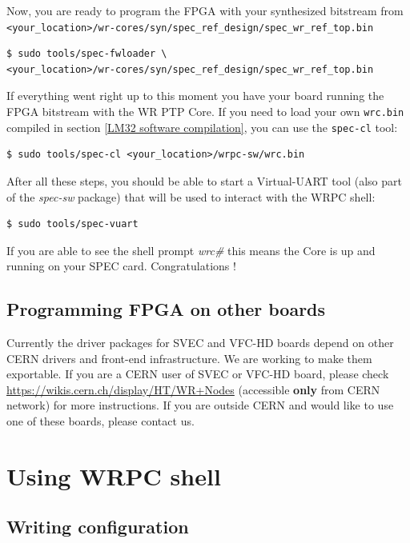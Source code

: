 \documentclass[a4paper, 12pt]{article}
\begin{document}
Now, you are ready to program the FPGA with your synthesized bitstream from
\texttt{<your\_location>/wr-cores/syn/spec\_ref\_design/spec\_wr\_ref\_top.bin}
\begin{lstlisting}
$ sudo tools/spec-fwloader \
<your_location>/wr-cores/syn/spec_ref_design/spec_wr_ref_top.bin
\end{lstlisting}

If everything went right up to this moment you have your board running the FPGA 
bitstream with the WR PTP Core. If you need to load your own \texttt{wrc.bin}
compiled in section \ref{LM32 software compilation}, you can use the
\texttt{spec-cl} tool:
\begin{lstlisting}
$ sudo tools/spec-cl <your_location>/wrpc-sw/wrc.bin
\end{lstlisting}

After all these steps, you should be able to start a Virtual-UART tool (also
part of the \textit{spec-sw} package) that will be used to interact with the
WRPC shell:
\begin{lstlisting}
$ sudo tools/spec-vuart
\end{lstlisting}

If you are able to see the shell prompt \textit{wrc\#} this means the Core
is up and running on your SPEC card. Congratulations !

\subsection{Programming FPGA on other boards}

Currently the driver packages for SVEC and VFC-HD boards depend on other CERN
drivers and front-end infrastructure. We are working to make them exportable. If
you are a CERN user of SVEC or VFC-HD board, please check
\url{https://wikis.cern.ch/display/HT/WR+Nodes} (accessible \textbf{only} from
CERN network) for more instructions. If you are outside CERN and would like to
use one of these boards, please contact us.

\newpage
\section{Using WRPC shell}

\subsection{Writing configuration}
\label{Writing configuration}
\end{document}
